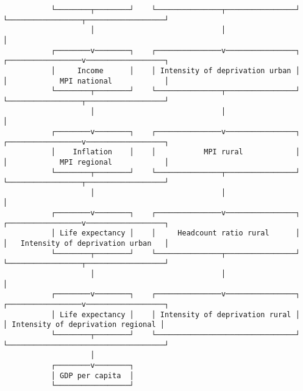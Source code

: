\documentclass[varwidth=100em,crop]{standalone}
\begin{document}
\begin{verbatim}
           └────────┬────────┘    └───────────────┬────────────────┘    └─────────────────┬──────────────────┘
                    │                             │                                       │
           ┌────────v────────┐    ┌───────────────v────────────────┐    ┌─────────────────v──────────────────┐
           │     Income      │    │ Intensity of deprivation urban │    │            MPI national            │
           └────────┬────────┘    └───────────────┬────────────────┘    └─────────────────┬──────────────────┘
                    │                             │                                       │
           ┌────────v────────┐    ┌───────────────v────────────────┐    ┌─────────────────v──────────────────┐
           │    Inflation    │    │           MPI rural            │    │            MPI regional            │
           └────────┬────────┘    └───────────────┬────────────────┘    └─────────────────┬──────────────────┘
                    │                             │                                       │
           ┌────────v────────┐    ┌───────────────v────────────────┐    ┌─────────────────v──────────────────┐
           │ Life expectancy │    │     Headcount ratio rural      │    │   Intensity of deprivation urban   │
           └────────┬────────┘    └───────────────┬────────────────┘    └─────────────────┬──────────────────┘
                    │                             │                                       │
           ┌────────v────────┐    ┌───────────────v────────────────┐    ┌─────────────────v──────────────────┐
           │ Life expectancy │    │ Intensity of deprivation rural │    │ Intensity of deprivation regional │
           └────────┬────────┘    └────────────────────────────────┘    └────────────────────────────────────┘
                    │
           ┌────────v────────┐
           │ GDP per capita  │
           └─────────────────┘
\end{verbatim}
\end{document}
